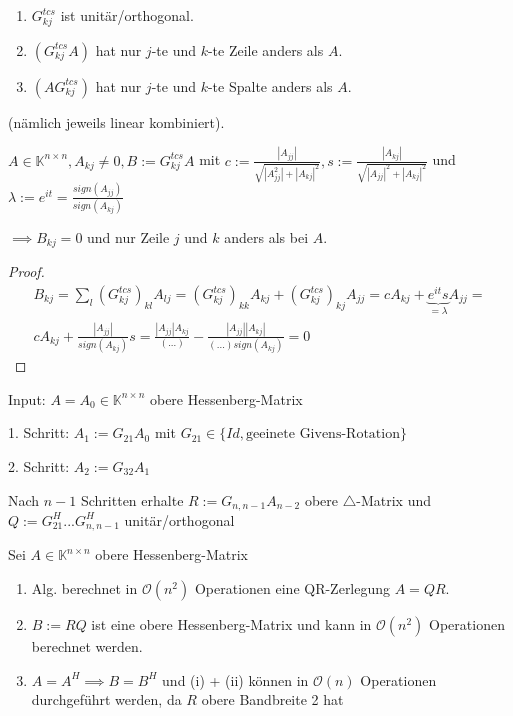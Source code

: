 \begin{lemma}
	\begin{enumerate}
		\item $G_{kj}^{tcs}$ ist unitär/orthogonal.
		\item $(G_{kj}^{tcs}A)$ hat nur $j$-te und $k$-te Zeile anders als $A$.
		\item $(AG_{kj}^{tcs})$ hat nur $j$-te und $k$-te Spalte anders als $A$.
	\end{enumerate}
	(nämlich jeweils linear kombiniert).
\end{lemma}

\begin{lemma}
	$A \in \mathbb{K}^{n\times n}, A_{kj} \neq 0, B := G_{kj}^{tcs}A$ mit $c := \frac{|A_{jj}|}{\sqrt{|A_{jj}^2| + |A_{kj}|^2}}, s := \frac{|A_{kj}|}{\sqrt{|A_{jj}|^2 + |A_{kj}|^2}}$ und $\lambda := e^{it} = \frac{sign(A_{jj})}{sign(A_{kj})}$
	
	$\implies B_{kj} = 0$ und nur Zeile $j$ und $k$ anders als bei $A$.
\end{lemma}

\begin{proof}
	\begin{align*}
		B_{kj} = \sum_{l} (G_{kj}^{tcs})_{kl} A_{lj} = (G_{kj}^{tcs})_{kk} A_{kj} + (G_{kj}^{tcs})_{kj} A_{jj} =
		c A_{kj} + \underbrace{e^{it}s}_{=\lambda} A_{jj} =\\
		c A_{kj} + \frac{|A_{jj}|}{sign(A_{kj})}s =
		\frac{|A_{jj}| A_{kj}}{(...)} - \frac{|A_{jj}| |A_{kj}|}{(...)sign(A_{kj})} = 0
	\end{align*}
\end{proof}

\begin{algorithm}
	Input: $A = A_0 \in \mathbb{K}^{n\times n}$ obere Hessenberg-Matrix
	
	1. Schritt: $A_1 := G_{21}A_0$ mit $G_{21} \in \{Id, \text{geeinete Givens-Rotation}\}$
	
	2. Schritt: $A_2 := G_{32} A_1$
	
	Nach $n-1$ Schritten erhalte $R := G_{n,n-1}A_{n-2}$ obere $\triangle$-Matrix und $Q := G_{21}^H ... G_{n,n-1}^H$ unitär/orthogonal
\end{algorithm}

\begin{theorem}
	Sei $A \in \mathbb{K}^{n\times n}$ obere Hessenberg-Matrix
	\begin{enumerate}
		\item Alg. berechnet in $\mathcal{O}(n^2)$ Operationen eine QR-Zerlegung $A=QR$.
		\item $B := RQ$ ist eine obere Hessenberg-Matrix und kann in $\mathcal{O}(n^2)$ Operationen berechnet werden.
		\item $A=A^H \implies B=B^H$ und (i) + (ii) können in $\mathcal{O}(n)$ Operationen durchgeführt werden, da $R$ obere Bandbreite 2 hat
	\end{enumerate}
\end{theorem}


